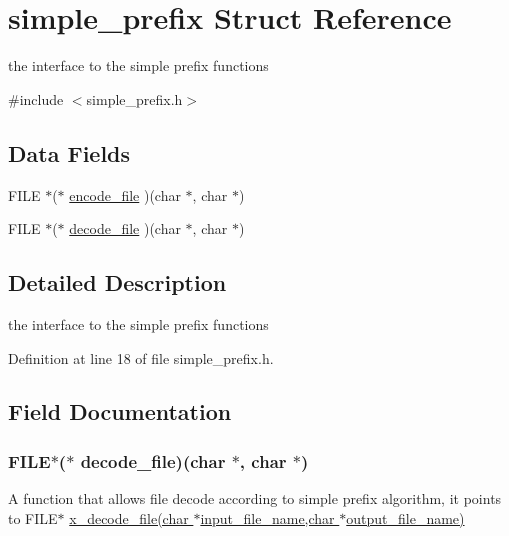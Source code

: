 \hypertarget{structsimple__prefix}{\section{simple\-\_\-prefix Struct Reference}
\label{structsimple__prefix}
}


the interface to the simple prefix functions  




{\ttfamily \#include $<$simple\-\_\-prefix.\-h$>$}

\subsection*{Data Fields}
\begin{DoxyCompactItemize}
\item 
F\-I\-L\-E $\ast$($\ast$ \hyperlink{structsimple__prefix_a73d0a239981b130553964b3839c20bdf}{encode\-\_\-file} )(char $\ast$, char $\ast$)
\item 
F\-I\-L\-E $\ast$($\ast$ \hyperlink{structsimple__prefix_a58708e15f01f3be37e12d3194e953b41}{decode\-\_\-file} )(char $\ast$, char $\ast$)
\end{DoxyCompactItemize}


\subsection{Detailed Description}
the interface to the simple prefix functions 

Definition at line 18 of file simple\-\_\-prefix.\-h.



\subsection{Field Documentation}
\hypertarget{structsimple__prefix_a58708e15f01f3be37e12d3194e953b41}{
\subsubsection[{decode\-\_\-file}]{\setlength{\rightskip}{0pt plus 5cm}F\-I\-L\-E$\ast$($\ast$ decode\-\_\-file)(char $\ast$, char $\ast$)}}\label{structsimple__prefix_a58708e15f01f3be37e12d3194e953b41}
A function that allows file decode according to simple prefix algorithm, it points to F\-I\-L\-E$\ast$ \hyperlink{simple__prefix_8c_a3d40a628ebc584a050b175aef67457b7}{x\-\_\-decode\-\_\-file(char $\ast$input\-\_\-file\-\_\-name,char $\ast$output\-\_\-file\-\_\-name)} 

